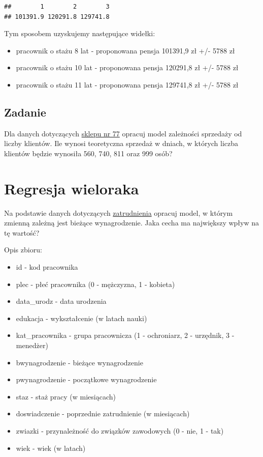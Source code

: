 \documentclass[]{book}
\providecommand{\tightlist}{%
  \setlength{\itemsep}{0pt}\setlength{\parskip}{0pt}}
\begin{document}
\begin{verbatim}
##        1        2        3 
## 101391.9 120291.8 129741.8
\end{verbatim}

Tym sposobem uzyskujemy następujące widełki:

\begin{itemize}
\tightlist
\item
  pracownik o stażu 8 lat - proponowana pensja 101391,9 zł +/- 5788 zł
\item
  pracownik o stażu 10 lat - proponowana pensja 120291,8 zł +/- 5788 zł
\item
  pracownik o stażu 11 lat - proponowana pensja 129741,8 zł +/- 5788 zł
\end{itemize}

\hypertarget{zadanie}{%
\subsection{Zadanie}\label{zadanie}}

Dla danych dotyczących \href{data/sklep77.csv}{sklepu nr 77} opracuj model zależności sprzedaży od liczby klientów. Ile wynosi teoretyczna sprzedaż w dniach, w których liczba klientów będzie wynosiła 560, 740, 811 oraz 999 osób?

\hypertarget{regresja-wieloraka}{%
\section{Regresja wieloraka}\label{regresja-wieloraka}}

Na podstawie danych dotyczących \href{data/pracownicy.xlsx}{zatrudnienia} opracuj model, w którym zmienną zależną jest bieżące wynagrodzenie. Jaka cecha ma największy wpływ na tę wartość?

Opis zbioru:

\begin{itemize}
\tightlist
\item
  id - kod pracownika
\item
  plec - płeć pracownika (0 - mężczyzna, 1 - kobieta)
\item
  data\_urodz - data urodzenia
\item
  edukacja - wykształcenie (w latach nauki)
\item
  kat\_pracownika - grupa pracownicza (1 - ochroniarz, 2 - urzędnik, 3 - menedżer)
\item
  bwynagrodzenie - bieżące wynagrodzenie
\item
  pwynagrodzenie - początkowe wynagrodzenie
\item
  staz - staż pracy (w miesiącach)
\item
  doswiadczenie - poprzednie zatrudnienie (w miesiącach)
\item
  zwiazki - przynależność do związków zawodowych (0 - nie, 1 - tak)
\item
  wiek - wiek (w latach)
\end{itemize}
\end{document}
